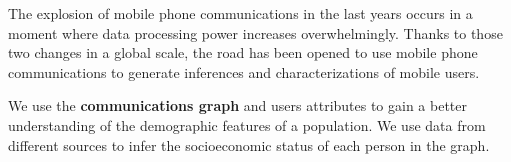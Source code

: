 The explosion of mobile phone communications in the last years occurs in a moment where data processing power increases overwhelmingly.  Thanks to those two changes in a global scale, the road has been opened to use mobile phone communications to generate inferences and characterizations of mobile users.


We use the \textbf{communications graph} and users attributes to gain a better understanding of the demographic features of a population. We use data from different sources to infer the socioeconomic status of each person in the graph.

